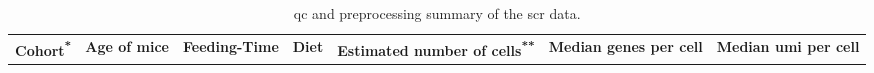 \begin{table}[ht!]
  \renewcommand{\arraystretch}{1.2} %
  \centering
 \caption[ and preprocessing summary of the  data]{\gls{qc} and preprocessing summary of the \gls{scr} data.}
     \label{tab:app_scrna_meta}
  \begin{tabularx}{\textwidth}{x C C C C C C}
    \toprule
    \textbf{Cohort\textsuperscript{*}} & \textbf{Age of mice} & \textbf{Feeding-Time} & \textbf{Diet} & \textbf{Estimated number of cells\textsuperscript{**}} & \textbf{Median genes per cell} & \textbf{Median \gls{umi} per cell} \\
    
    

\end{tabularx}
\end{table}
